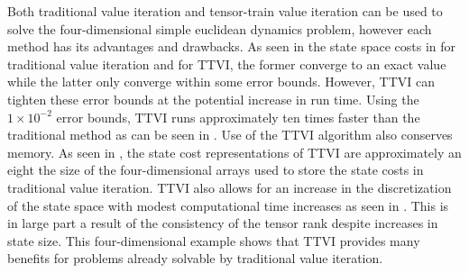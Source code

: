 Both traditional value iteration and tensor-train value iteration can be used to solve the four-dimensional simple euclidean dynamics problem, however each method has its advantages and drawbacks. As seen in the state space costs in  for traditional value iteration and  for TTVI, the former converge to an exact value while the latter only converge within some error bounds. However, TTVI can tighten these error bounds at the potential increase in run time. Using the $1 \times 10^{-2}$ error bounds, TTVI runs approximately ten times faster than the traditional method as can be seen in . Use of the TTVI algorithm also conserves memory. As seen in , the state cost representations of TTVI are approximately an eight the size of the four-dimensional arrays used to store the state costs in traditional value iteration. TTVI also allows for an increase in the discretization of the state space with modest computational time increases as seen in . This is in large part a result of the consistency of the tensor rank despite increases in state size. This four-dimensional example shows that TTVI provides many benefits for problems already solvable by traditional value iteration.               


